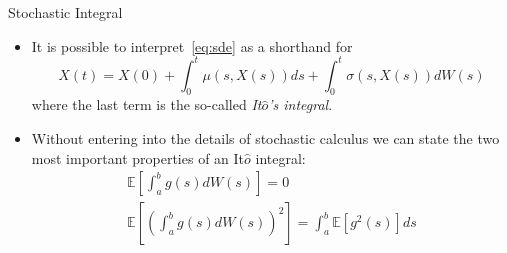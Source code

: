 \documentclass{beamer}
\begin{document}
\begin{frame}{Stochastic Integral}
	\begin{itemize}
		\item It is possible to interpret~\cref{eq:sde} as a shorthand for 
			\begin{equation*}
				X(t) = X(0) + \int_0^t \mu(s,X(s)) ds + \int_0^t \sigma(s,X(s)) dW(s)
			\end{equation*}
		where the last term is the so-called \emph{It$\hat{o}$'s integral}.
		\item Without entering into the details of stochastic calculus we can state the two most important properties of an It$\hat{o}$ integral:
			\begin{equation*}
				\begin{gathered}
					\mathbb{E}\left[\int_a^b g(s) dW(s)\right] = 0 \\
					\mathbb{E}\left[\left(\int_a^b g(s) dW(s)\right)^2\right] = \int_a^b\mathbb{E}[g^2(s)]ds\\
				\end{gathered}
			\end{equation*}
	\end{itemize}  
\end{frame}
\end{document}
